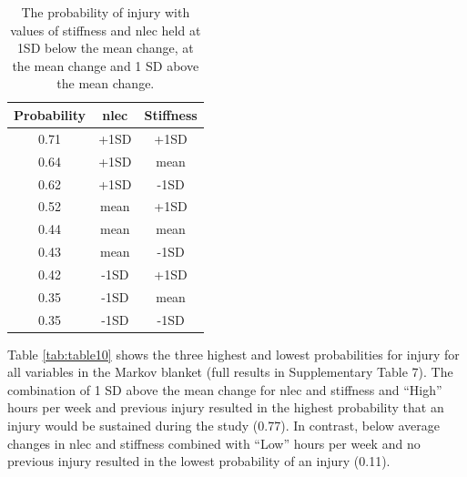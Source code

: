 \documentclass[
  english,
  man]{apa6}
\begin{document}
\begin{table}[H]

\caption{\label{tab:table9}The probability of injury with values of stiffness and nlec held at 1SD below the mean change, at the mean change and 1 SD above the mean change.}
\centering
\begin{tabular}[t]{c|c|c}
\hline
\textbf{Probability} & \textbf{nlec} & \textbf{Stiffness}\\
\hline
0.71 & +1SD & +1SD\\
\hline
0.64 & +1SD & mean\\
\hline
0.62 & +1SD & -1SD\\
\hline
0.52 & mean & +1SD\\
\hline
0.44 & mean & mean\\
\hline
0.43 & mean & -1SD\\
\hline
0.42 & -1SD & +1SD\\
\hline
0.35 & -1SD & mean\\
\hline
0.35 & -1SD & -1SD\\
\hline
\end{tabular}
\end{table}

Table \ref{tab:table10} shows the three highest and lowest probabilities for injury for all variables in the Markov blanket (full results in Supplementary Table 7).
The combination of 1 SD above the mean change for nlec and stiffness and ``High'' hours per week and previous injury resulted in the highest probability that an injury would be sustained during the study (0.77).
In contrast, below average changes in nlec and stiffness combined with ``Low'' hours per week and no previous injury resulted in the lowest probability of an injury (0.11).
\end{document}
